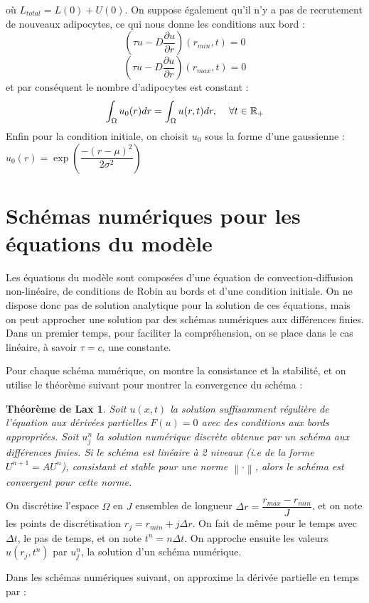 \documentclass[a4paper,fleqn,leqno]{article}
\newtheorem*{theorem*}{Théorème de Lax}
\newcommand{\bint}{\displaystyle\int}
\begin{document}
où $L_{total} = L(0) + U(0)$.
On suppose également qu'il n'y a pas de recrutement de nouveaux adipocytes, ce qui nous donne les conditions aux bord :
\[\left(\tau u-D\dfrac{\partial u}{\partial r}\right)(r_{min},t) = 0\]
\[\left(\tau u-D\dfrac{\partial u}{\partial r}\right)(r_{max},t) = 0\]
et par conséquent le nombre d'adipocytes est constant :
\[\bint_\Omega u_0(r)dr = \bint_\Omega u(r,t)dr, \hspace{.4cm} \forall t\in\mathbb{R}_+\]
Enfin pour la condition initiale, on choisit $u_0$ sous la forme d'une gaussienne :
$u_0(r) = \exp\left(\dfrac{-(r-\mu)^2}{2\sigma^2}\right)$


\section{Schémas numériques pour les équations du modèle}


Les équations du modèle sont composées d'une équation de convection-diffusion non-linéaire, de conditions de Robin au bords et d'une condition initiale. On ne dispose donc pas de solution analytique pour la solution de ces équations, mais on peut approcher une solution par des schémas numériques aux différences finies. Dans un premier temps, pour faciliter la compréhension, on se place dans le cas linéaire, à savoir $\tau = c$, une constante.

Pour chaque schéma numérique, on montre la consistance et la stabilité, et on utilise le théorème suivant pour montrer la convergence du schéma \cite{Lax}:

\begin{theorem*}
Soit $u(x,t)$ la solution suffisamment régulière de l'équation aux dérivées partielles $F(u) = 0$ avec des conditions aux bords appropriées. Soit $u^n_j$ la solution numérique discrète obtenue par un schéma aux différences finies. Si le schéma est linéaire à 2 niveaux (i.e de la forme $U^{n+1} = AU^n$), consistant et stable pour une norme $\left\lVert\cdot\right\rVert$, alors le schéma est convergent pour cette norme.
\end{theorem*}

On discrétise l'espace $\Omega$ en $J$ ensembles de longueur $\Delta r = \dfrac{r_{max} - r_{min}}{J}$, et on note les points de discrétisation $r_j =r_{min}+j\Delta r$. On fait de même pour le temps avec $\Delta t$, le pas de temps, et on note $t^n = n\Delta t$. On approche ensuite les valeurs $u(r_j,t^n)$ par $u^n_j$, la solution d'un schéma numérique.

Dans les schémas numériques suivant, on approxime la dérivée partielle en temps par :
\end{document}

